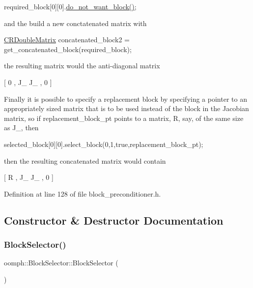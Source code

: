 required\+\_\+block\mbox{[}0\mbox{]}\mbox{[}0\mbox{]}.\hyperlink{classoomph_1_1BlockSelector_a2548e42fd02e258d46d0a4f74919f11a}{do\+\_\+not\+\_\+want\+\_\+block()};

and the build a new conctatenated matrix with

\hyperlink{classoomph_1_1CRDoubleMatrix}{C\+R\+Double\+Matrix} concatenated\+\_\+block2 = get\+\_\+concatenated\+\_\+block(required\+\_\+block);

the resulting matrix would the anti-\/diagonal matrix

\mbox{[} 0 , J\+\_ J\+\_ , 0 \mbox{]}

Finally it is possible to specify a replacement block by specifying a pointer to an appropriately sized matrix that is to be used instead of the block in the Jacobian matrix, so if replacement\+\_\+block\+\_\+pt points to a matrix, R, say, of the same size as J\+\_, then

selected\+\_\+block\mbox{[}0\mbox{]}\mbox{[}0\mbox{]}.select\+\_\+block(0,1,true,replacement\+\_\+block\+\_\+pt);

then the resulting concatenated matrix would contain

\mbox{[} R , J\+\_ J\+\_ , 0 \mbox{]} 

Definition at line 128 of file block\+\_\+preconditioner.\+h.



\subsection{Constructor \& Destructor Documentation}
\mbox{\label{classoomph_1_1BlockSelector_aaed92a7e9c7845821e616e744611cc7c}} 
\subsubsection{\texorpdfstring{Block\+Selector()}{BlockSelector()}\hspace{0.1cm}{\footnotesize\ttfamily [1/2]}}
{\footnotesize\ttfamily oomph\+::\+Block\+Selector\+::\+Block\+Selector (\begin{DoxyParamCaption}{ }\end{DoxyParamCaption})\hspace{0.3cm}{\ttfamily [inline]}}



